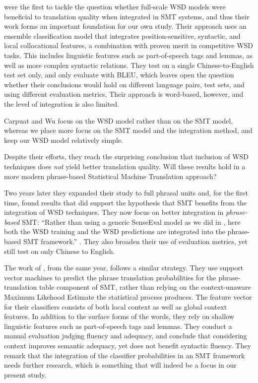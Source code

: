 \cite{CarpuatWu05} were the first to tackle the question whether full-scale WSD
models were beneficial to translation quality when integrated in SMT systems,
and thus their work forms an important foundation for our own study.  Their
approach uses an ensemble classification model that integrates
position-sensitive, syntactic, and local collocational features, a combination
with proven merit in competitive WSD tasks. This includes linguistic features
such as part-of-speech tags and lemmas, as well as more complex syntactic
relations.  They test on a single Chinese-to-English test set only, and only
evaluate with BLEU, which leaves open the question whether their conclusions
would hold on different language pairs, test sets, and using different
evaluation metrics.  Their approach is word-based, however, and the level of
integration is also limited.

Carpuat and Wu focus on the WSD model rather than on the SMT
model, whereas we place more focus on the SMT model and the
integration method, and keep our WSD model relatively
simple.

Despite their efforts, they reach the surprising conclusion that inclusion of
WSD techniques does \emph{not} yield better translation quality. Will these
results hold in a more modern phrase-based Statistical Machine Translation
approach?

Two years later they expanded their study to full phrasal units
\citep{CarpuatWu07} and, for the first time, found results that did support the
hypothesis that SMT benefits from the integration of WSD techniques. They now
focus on better integration in \emph{phrase-based} SMT: ``Rather than using a
generic SenseEval model as we did in \cite{CarpuatWu05}, here both the WSD
training and the WSD predictions are integrated into the phrase-based SMT
framework.'' \citep{CarpuatWu07}. They also broaden their use of evaluation
metrics, yet still test on only Chinese to English.

The work of \cite{Gimenez+07}, from the same year, follows a similar
strategy. They use support vector machines to predict the phrase
translation probabilities for the phrase-translation table component
of SMT, rather than relying on the context-unaware Maximum Likehood
Estimate the statistical process produces. The feature vector for
their classifiers consists of both local context as well as global
context features.  In addition to the surface forms of the words, they
rely on shallow linguistic features such as part-of-speech tags and
lemmas. They conduct a manual evaluation judging fluency and
adequacy, and conclude that considering context improves semantic
adequacy, yet does not benefit syntactic fluency. They remark that the
integration of the classifier probabilities in an SMT framework needs
further research, which is something that will indeed be a focus in
our present study.

